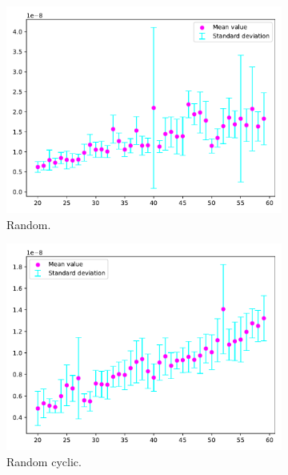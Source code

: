 \begin{figure}[H]
    \centering
    \begin{subfigure}[b]{.24\textwidth}
        \centering
        \includegraphics[width=\textwidth]{figures/n/random_function_of_n_n_20_60__kappa_55582.80548329922}
        \caption{Random.}\label{fig:na}
    \end{subfigure}
    \hfill
    \begin{subfigure}[b]{.24\textwidth}
        \centering
        \includegraphics[width=\textwidth]{figures/n/random_cyclic_function_of_n_n_20_60__kappa_300}
        \caption{Random cyclic.}\label{fig:nb}
    \end{subfigure}
    \hfill
    \begin{subfigure}[b]{.24\textwidth}

\end{subfigure}
\end{figure}
